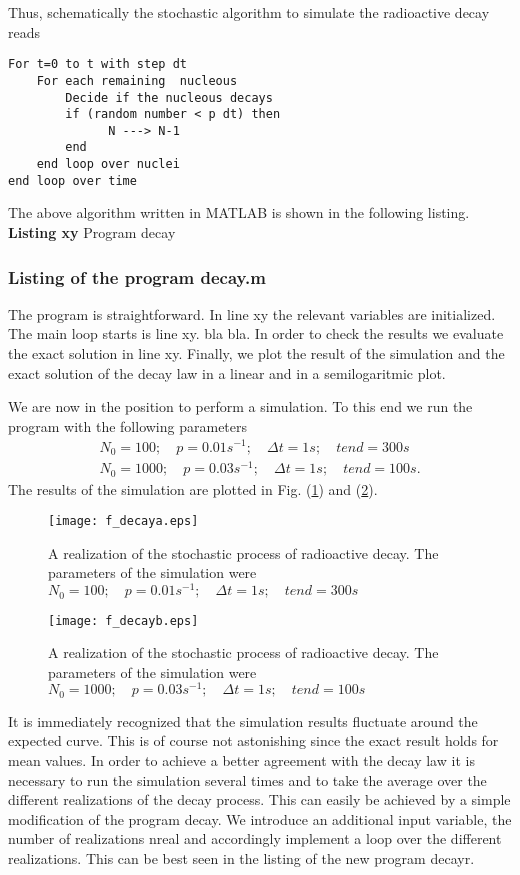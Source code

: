 Thus, schematically the stochastic algorithm to simulate the 
radioactive decay reads

\begin{verbatim}
For t=0 to t with step dt
    For each remaining  nucleous
        Decide if the nucleous decays
        if (random number < p dt) then
              N ---> N-1
        end
    end loop over nuclei
end loop over time
\end{verbatim}

The above algorithm written in MATLAB is shown in the following listing.
{\bf Listing xy} Program decay
\subsubsection{Listing of the program decay.m}


The program is straightforward. In line xy the relevant variables 
are initialized. The main loop starts is line xy. bla bla.
In order to check the results we evaluate the exact solution in 
line xy. Finally, we plot the result of the simulation and the 
exact solution of the decay law in a linear and in a 
semilogaritmic plot. 

We are now in the position to perform a simulation. To this end we
run the program with the following parameters
\begin{eqnarray*}
N_0 = 100; \quad p = 0.01 s^{-1}; \quad \Delta t = 1s;  \quad tend = 300s \\
N_0 = 1000; \quad p= 0.03 s^{-1}; \quad \Delta t = 1s; \quad tend = 100s.
\end{eqnarray*}
The results of the simulation are plotted in Fig. (\ref{FIG_DECAYA}) and 
(\ref{FIG_DECAYB}).
\begin{figure}
\label{FIG_DECAYA}
\texttt{[image: f\_decaya.eps]}
\caption{A realization of the stochastic process of radioactive decay.
The parameters of the simulation were $N_0 = 100; 
\quad p = 0.01 s^{-1}; \quad \Delta t = 1s;  \quad tend = 300s$}
\end{figure}
\begin{figure}
\label{FIG_DECAYB}
\texttt{[image: f\_decayb.eps]}
\caption{A realization of the stochastic process of radioactive decay.
The parameters of the simulation were $N_0 = 1000; 
\quad p = 0.03 s^{-1}; \quad \Delta t = 1s;  \quad tend = 100s$}
\end{figure}
 It is 
immediately recognized that the simulation results fluctuate around 
the expected curve. This is of course not astonishing since the 
exact result holds for mean values. In order to achieve a better
agreement with the decay law it is necessary to run the simulation
several times and to take the average over the different 
realizations of the decay process. This can easily be achieved by 
a simple modification of the program {\sf decay}. We 
introduce an additional input variable, the number of realizations
{\sf nreal} and accordingly implement a loop over the different 
realizations. This can be best seen in the listing of the 
new program {\sf decayr}.


